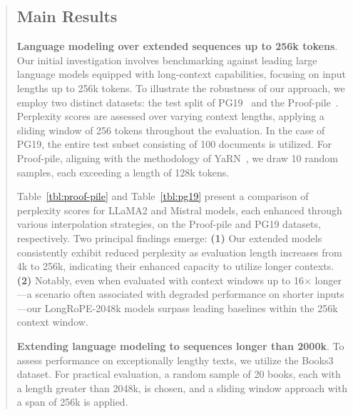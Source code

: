 \begin{abstract}
\subsection{Main Results}

\label{sec:mainresult}
\textbf{Language modeling over extended sequences up to 256k tokens}. Our initial investigation involves benchmarking against leading large language models equipped with long-context capabilities, focusing on input lengths up to 256k tokens. To illustrate the robustness of our approach, we employ two distinct datasets: the test split of PG19~\cite{pile} and the Proof-pile~\cite{pg19}. Perplexity scores are assessed over varying context lengths, applying a sliding window of 256 tokens throughout the evaluation. In the case of PG19, the entire test subset consisting of 100 documents is utilized. For Proof-pile, aligning with the methodology of YaRN~\cite{yarn}, we draw 10 random samples, each exceeding a length of 128k tokens.

Table~\ref{tbl:proof-pile} and Table~\ref{tbl:pg19} present a comparison of perplexity scores for LLaMA2 and Mistral models, each enhanced through various interpolation strategies, on the Proof-pile and PG19 datasets, respectively. Two principal findings emerge: \textbf{(1)} Our extended models consistently exhibit reduced perplexity as evaluation length increases from 4k to 256k, indicating their enhanced capacity to utilize longer contexts. \textbf{(2)} Notably, even when evaluated with context windows up to 16$\times$ longer—a scenario often associated with degraded performance on shorter inputs—our LongRoPE-2048k models surpass leading baselines within the 256k context window.

\textbf{Extending language modeling to sequences longer than 2000k}. To assess performance on exceptionally lengthy texts, we utilize the Books3~\cite{pile} dataset. For practical evaluation, a random sample of 20 books, each with a length greater than 2048k, is chosen, and a sliding window approach with a span of 256k is applied.


\end{abstract}

